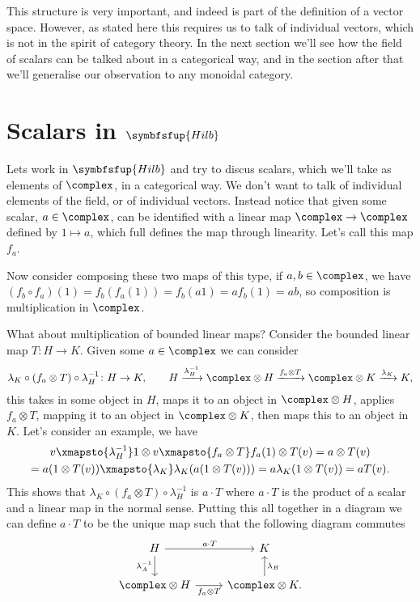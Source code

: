 \documentclass[fleqn]{NotesClass}
\makeatletter
\newcommand{\c@egory}[1]{\symbfsfup{#1}}
\newcommand{\Hilb}{\c@egory{Hilb}}
\makeatother
\begin{document}
    This structure is very important, and indeed is part of the definition of a vector space.
    However, as stated here this requires us to talk of individual vectors, which is not in the spirit of category theory.
    In the next section we'll see how the field of scalars can be talked about in a categorical way, and in the section after that we'll generalise our observation to any monoidal category.
    
    \section{Scalars in \texorpdfstring{\(\Hilb\)}{Hilb}}
    Lets work in \(\Hilb\) and try to discus scalars, which we'll take as elements of \(\complex\), in a categorical way.
    We don't want to talk of individual elements of the field, or of individual vectors.
    Instead notice that given some scalar, \(a \in \complex\), can be identified with a linear map \(\complex \to \complex\) defined by \(1 \mapsto a\), which full defines the map through linearity.
    Let's call this map \(f_a\).
    
    Now consider composing these two maps of this type, if \(a, b \in \complex\), we have \((f_b \circ f_a)(1) = f_b(f_a(1)) = f_b(a1) = af_b(1) = ab\), so composition is multiplication in \(\complex\).
    
    What about multiplication of bounded linear maps?
    Consider the bounded linear map \(T \colon H \to K\).
    Given some \(a \in \complex\) we can consider
    \begin{equation}
        \lambda_K \circ (f_a \otimes T) \circ \lambda_H^{-1} \colon H \to K, \qquad H \xrightarrow{\lambda_H^{-1}} \complex \otimes H \xrightarrow{f_a \otimes T} \complex \otimes K \xrightarrow{\lambda_K} K,
    \end{equation}
    this takes in some object in \(H\), maps it to an object in \(\complex \otimes H\), applies \(f_a \otimes T\), mapping it to an object in \(\complex \otimes K\), then maps this to an object in \(K\).
    Let's consider an example, we have
    \begin{multline}
        v \xmapsto{\lambda_{H}^{-1}} 1 \otimes v \xmapsto{f_a \otimes T} f_a(1) \otimes T(v) = a\otimes T(v)\\
        = a(1 \otimes T(v)) \xmapsto{\lambda_K} \lambda_K(a(1 \otimes T(v))) = a\lambda_K(1 \otimes T(v)) = aT(v).
    \end{multline}
    This shows that \(\lambda_K \circ (f_a \otimes T) \circ \lambda_H^{-1}\) is \(a \cdot T\) where \(a \cdot T\) is the product of a scalar and a linear map in the normal sense.
    Putting this all together in a diagram we can define \(a \cdot T\) to be the unique map such that the following diagram commutes
    \begin{equation}
        \begin{tikzcd}
            H \arrow[r, "a \cdot T"] \arrow[d, "\lambda_A^{-1}"'] & K\\
            \complex \otimes H \arrow[r, "f_a \otimes T"'] & \complex \otimes K. \arrow[u, "\lambda_B"']
        \end{tikzcd}
    \end{equation}
    
\end{document}
